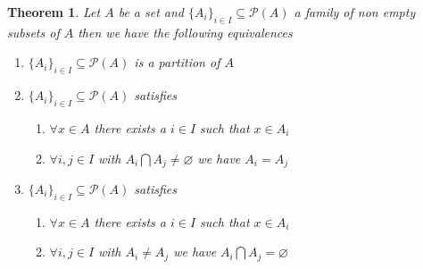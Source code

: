 \documentclass{book}
\newtheorem{theorem}{Theorem}
\begin{document}
\begin{theorem}
  \label{equivalence relation partition alternative}Let $A$ be a set and $\{
  A_i \}_{i \in I} \subseteq \mathcal{P} (A)$ a family of non empty subsets of
  $A$ then we have the following equivalences
  \begin{enumerate}
    \item $\{ A_i \}_{i \in I} \subseteq \mathcal{P} (A)$ is a partition of
    $A$
    
    \item  $\{ A_i \}_{i \in I} \subseteq \mathcal{P} (A)$ satisfies
    \begin{enumerate}
      \item $\forall x \in A$ there exists a $i \in I$ such that $x \in A_i$
      
      \item $\forall i, j \in I$ with $A_i \bigcap A_j \neq \varnothing$ we
      have $A_i = A_j$
    \end{enumerate}
    \item $\{ A_i \}_{i \in I} \subseteq \mathcal{P} (A)$ satisfies
    \begin{enumerate}
      \item $\forall x \in A$ there exists a $i \in I$ such that $x \in A_i$
      
      \item $\forall i, j \in I$ with $A_i \neq A_j$ we have $A_i \bigcap A_j
      = \varnothing$
    \end{enumerate}
  \end{enumerate}
\end{theorem}
\end{document}
